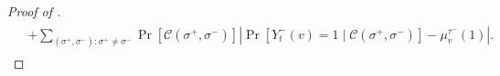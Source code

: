 \documentclass[11pt]{amsart}
\renewcommand{\Pr}{\mathop{\mathrm{Pr}}\nolimits}
\renewcommand{\P}{\Pr}
\theoremstyle{definition}
\theoremstyle{remark}
\begin{document}
\begin{proof}[Proof of ]
\begin{align}
\begin{split}
    &+\sum_{(\sigma^+,\sigma^-):\sigma^+\neq \sigma^-} \Pr[\mathcal{C}(\sigma^+,\sigma^-)] \left | \P[Y_t^-(v)=1 \mid \mathcal{C}(\sigma^+,\sigma^-)] -\mu_v^{\tau^-}(1) \right |.    
\end{split}
\end{align}


\end{proof}
\end{document}
